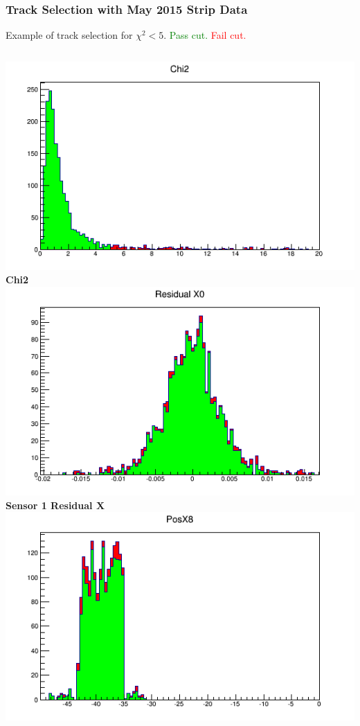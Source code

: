 \documentclass{beamer}
\begin{document}
\begin{frame}
\frametitle{Track Selection with May 2015 Strip Data}
Example of track selection for $\chi^{2}<5$. \textcolor{green}{Pass cut.}  \textcolor{red}{Fail cut.}
\begin{columns}[t]
\centering
\includegraphics[width=0.8\linewidth]{pics/chi2.png}\\
\tiny{\textbf{Chi2}}\\
\includegraphics[width=0.8\linewidth]{pics/residual1.png}\\
\tiny{\textbf{Sensor 1 Residual X}}\\
\centering
\includegraphics[width=0.8\linewidth]{pics/Pos8X.png}\\ 

\end{columns}
\end{frame}
\end{document}
